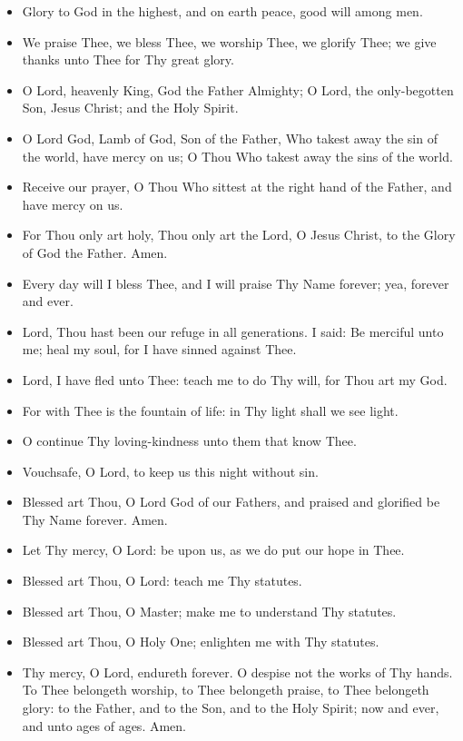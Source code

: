 \documentclass[twoside, letterpaper, 12pt]{report}
\begin{document}
\begin{maybetwocolumns}







\begin{itemize}[label=\small{+},leftmargin=*]
\item Glory to God in the highest, and on earth peace, good will among men.
\item We praise Thee, we bless Thee, we worship Thee, we glorify Thee;
      we give thanks unto Thee for Thy great glory.
\item O Lord, heavenly King, God the Father Almighty;
      O Lord, the only-begotten Son, Jesus Christ; and the Holy Spirit.
\item O Lord God, Lamb of God, Son of the Father, Who takest away the sin of the world,
      have mercy on us; O Thou Who takest away the sins of the world.
\item Receive our prayer, O Thou Who sittest at the right hand of the Father,
      and have mercy on us.
\item For Thou only art holy, Thou only art the Lord, O Jesus Christ,
      to the Glory of God the Father. Amen.
\item Every day will I bless Thee, and I will praise Thy Name forever;
      yea, forever and ever.
\item Lord, Thou hast been our refuge in all generations.
      I said: Be merciful unto me; heal my soul, for I have sinned against Thee.
\item Lord, I have fled unto Thee: teach me to do Thy will, for Thou art my God.
\item For with Thee is the fountain of life: in Thy light shall we see light.
\item O continue Thy loving-kindness unto them that know Thee.
\item Vouchsafe, O Lord, to keep us this night without sin.
\item Blessed art Thou, O Lord God of our Fathers,
      and praised and glorified be Thy Name forever. Amen.
\item Let Thy mercy, O Lord: be upon us, as we do put our hope in Thee.
\item Blessed art Thou, O Lord: teach me Thy statutes.
\item Blessed art Thou, O Master; make me to understand Thy statutes.
\item Blessed art Thou, O Holy One; enlighten me with Thy statutes.
\item Thy mercy, O Lord, endureth forever.
      O despise not the works of Thy hands.
      To Thee belongeth worship, to Thee belongeth praise, to Thee belongeth glory:
      to the Father, and to the Son, and to the Holy Spirit;
      now and ever, and unto ages of ages. Amen.
\end{itemize}
\end{maybetwocolumns}
\end{document}
